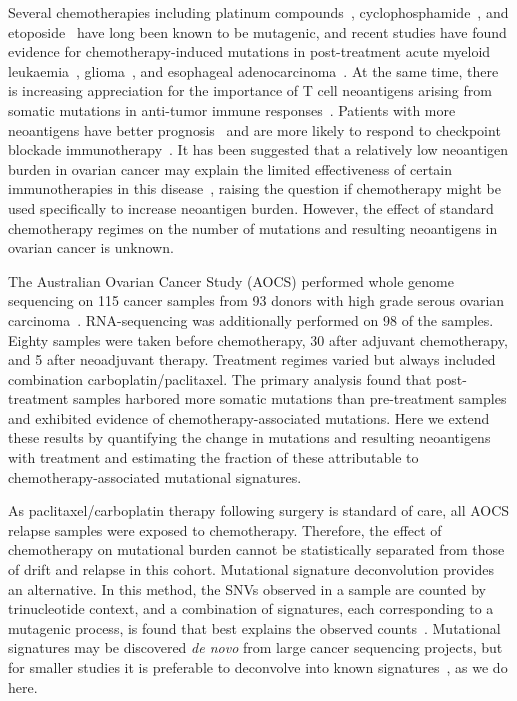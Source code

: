 Several chemotherapies including platinum compounds~\cite{Hannan_1989}, cyclophosphamide~\cite{Anderson_1995}, and etoposide~\cite{NAKANOMYO_1986} have long been known to be mutagenic, and recent studies have found evidence for chemotherapy-induced mutations in post-treatment acute myeloid leukaemia~\cite{Ding_2012}, glioma~\cite{Johnson_2013}, and esophageal adenocarcinoma~\cite{Murugaesu_2015}. At the same time, there is increasing appreciation for the importance of T cell neoantigens arising from somatic mutations in anti-tumor immune responses~\cite{Schumacher_2015}. Patients with more neoantigens have better prognosis~\cite{Brown_2014} and are more likely to respond to checkpoint blockade immunotherapy~\cite{Van_Allen_2015,Rizvi_2015}. It has been suggested that a relatively low neoantigen burden in ovarian cancer may explain the limited effectiveness of certain immunotherapies in this disease~\cite{Martin_2016}, raising the question if chemotherapy might be used specifically to increase neoantigen burden. However, the effect of standard chemotherapy regimes on the number of mutations and resulting neoantigens in ovarian cancer is unknown.

The Australian Ovarian Cancer Study (AOCS) performed whole genome sequencing on 115 cancer samples from 93 donors with high grade serous ovarian carcinoma~\cite{Patch_2015}. RNA-sequencing was additionally performed on 98 of the samples. Eighty samples were taken before chemotherapy, 30 after adjuvant chemotherapy, and 5 after neoadjuvant therapy. Treatment regimes varied but always included combination carboplatin/paclitaxel. The primary analysis found that post-treatment samples harbored more somatic mutations than pre-treatment samples and exhibited evidence of chemotherapy-associated mutations. Here we extend these results by quantifying the change in mutations and resulting neoantigens with treatment and estimating the fraction of these attributable to chemotherapy-associated mutational signatures.

As paclitaxel/carboplatin therapy following surgery is standard of care, all AOCS relapse samples were exposed to chemotherapy. Therefore, the effect of chemotherapy on mutational burden cannot be statistically separated from those of drift and relapse in this cohort. Mutational signature deconvolution provides an alternative. In this method, the SNVs observed in a sample are counted by trinucleotide context, and a combination of signatures, each corresponding to a mutagenic process, is found that best explains the observed counts~\cite{Alexandrov2013}. Mutational signatures may be discovered \textit{de novo} from large cancer sequencing projects, but for smaller studies it is preferable to deconvolve into known signatures~\cite{Rosenthal_2016}, as we do here.

